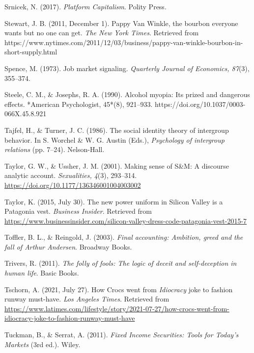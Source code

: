 \begin{thebibliography}{}
    Srnicek, N. (2017). \textit{Platform Capitalism}. Polity Press.

    Stewart, J. B. (2011, December 1). Pappy Van Winkle, the bourbon everyone wants but no one can get. \textit{The New York Times}. Retrieved from https://www.nytimes.com/2011/12/03/business/pappy-van-winkle-bourbon-in-short-supply.html

    Spence, M. (1973). Job market signaling. \textit{Quarterly Journal of Economics, 87}(3), 355–374.

    Steele, C. M., \& Josephs, R. A. (1990). Alcohol myopia: Its prized and dangerous effects. *American Psychologist, 45*(8), 921–933. https://doi.org/10.1037/0003-066X.45.8.921

    
    Tajfel, H., \& Turner, J. C. (1986). The social identity theory of intergroup behavior. In S. Worchel \& W. G. Austin (Eds.), \textit{Psychology of intergroup relations} (pp. 7–24). Nelson-Hall.

    Taylor, G. W., \& Ussher, J. M. (2001). Making sense of S\&M: A discourse analytic account. \textit{Sexualities, 4}(3), 293--314. \url{https://doi.org/10.1177/136346001004003002}

    Taylor, K. (2015, July 30). The new power uniform in Silicon Valley is a Patagonia vest. \textit{Business Insider}. Retrieved from \url{https://www.businessinsider.com/silicon-valley-dress-code-patagonia-vest-2015-7}

    Toffler, B. L., \& Reingold, J. (2003). \textit{Final accounting: Ambition, greed and the fall of Arthur Andersen}. Broadway Books.

    Trivers, R. (2011). \textit{The folly of fools: The logic of deceit and self-deception in human life}. Basic Books.

    Tschorn, A. (2021, July 27). How Crocs went from \textit{Idiocracy} joke to fashion runway must-have. \textit{Los Angeles Times}. Retrieved from \url{https://www.latimes.com/lifestyle/story/2021-07-27/how-crocs-went-from-idiocracy-joke-to-fashion-runway-must-have}

    Tuckman, B., \& Serrat, A. (2011). \textit{Fixed Income Securities: Tools for Today's Markets} (3rd ed.). Wiley.


\end{thebibliography}
